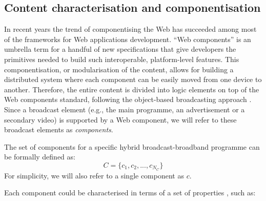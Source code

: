 \subsection{Content characterisation and componentisation} \label{components}
In recent years the trend of componentising the Web \cite{savage2015componentizing} has succeeded among most of the frameworks for Web applications development. 
``Web components'' \cite{webcomps} is an umbrella term for a handful of new specifications that give developers the primitives needed to build such interoperable, platform-level features. 
This componentisation, or modularisation of the content, allows for building a distributed system where each component can be easily moved from one device to another. 
Therefore, the entire content is divided into logic elements on top of the Web components standard, following the object-based broadcasting approach \cite{armstrong2014object}. 
Since a broadcast element (e.g., the main programme, an advertisement or a secondary video) is supported by a Web component, we will  refer to these broadcast elements as \emph{components}. 

The set of components for a specific hybrid broadcast-broadband programme can be formally defined as:
\begin{equation}
C = \{  c_1, c_2, ..., c_{N_C} \}
\end{equation}
For simplicity, we will also refer to a single component as $c$.

Each component could be characterised in terms of a set of properties \cite{bbcExp} \cite{sarkis2018multi}, such as:

